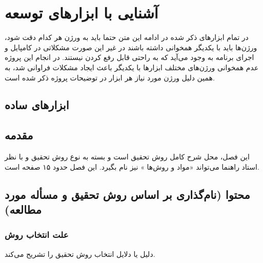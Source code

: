 \chapter{آشنایی با ابزار‌های توسعه}
در تمام ابزارهای ذکر شده در ادامه این متن حتما باید به ورژن هر کدام دقت شود، ورژن‌ها باید با یکدیگر همخوانی داشته باشند در غیر این صورت مشکلاتی در کامپایل و اجرای برنامه به وجود می‌آید که به راحتی قابل رفع کردن نیستند. در انجام این پروژه عدم همخوانی ورژن‌های مختلف ابزارها با یکدیگر باعث ایجاد مشکلات فراوانی شد، به همین دلیل ورژن مورد نیاز هر ابزار در توضیحات پروژه ذکر شده است.

\section{ابزارهای ساده}










\section{مقدمه} 
این فصل، محل شرح کامل روش تحقیق است و بسته به نوع روش تحقیق و با نظر استاد راهنما می‌تواند «مواد و روش‌ها%
»
نیز نام بگیرد. این فصل حدود ۱۵ صفحه است.

\section{محتوا (نام‌گذاری بر اساس روش تحقیق و مسأله مورد مطالعه)}
\subsection{علت انتخاب روش}
دلیل یا دلایل انتخاب روش تحقیق را تشریح می‌کند.

